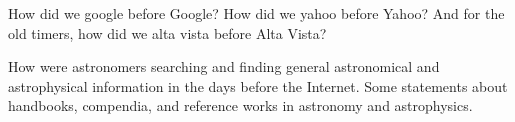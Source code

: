 
How did we google before Google\texttrademark? How did we yahoo before
Yahoo\texttrademark? And for the old timers, how did we alta vista
before Alta Vista\texttrademark?

How were astronomers searching and finding general astronomical and
astrophysical information in the days before the Internet. Some
statements about handbooks, compendia, and reference works in 
astronomy and astrophysics.
